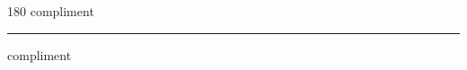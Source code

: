 
\begin{frame}
\begin{center}
\begin{turn}{180}
{\fontsize{2.5cm}{1em}\selectfont compliment}
\end{turn}
\vspace{1em}\par  
\hrule
\vspace{1em}\par  
{\fontsize{2.5cm}{1em}\selectfont compliment}
\end{center}
\end{frame}
